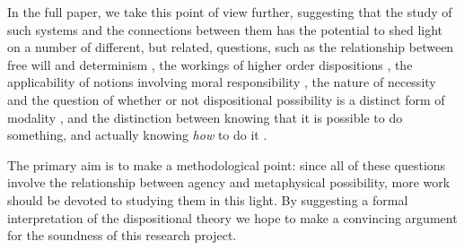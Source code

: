 \documentclass{article}
\begin{document}
In the full paper, we take this point of view further, suggesting that the study of such systems and the connections between them has the potential to shed light on a number of different, but related, questions, such as the relationship between free will and determinism \cite{Listfree,strawsonfree}, the workings of higher order dispositions \cite{dispmod}, the applicability of notions involving moral responsibility \cite{frankfurt,mensrea}, the nature of necessity and the question of whether or not dispositional possibility is a distinct form of modality \cite{DM,EaM,Los}, and the distinction between knowing that it is possible to do something, and actually knowing \emph{how} to do it \cite{atlhow,atlhowto}.

The primary aim is to make a methodological point: since all of these questions involve the relationship between agency and metaphysical possibility, more work should be devoted to studying them in this light. By suggesting a formal interpretation of the dispositional theory we hope to make a convincing argument for the soundness of this research project.



\end{document}

